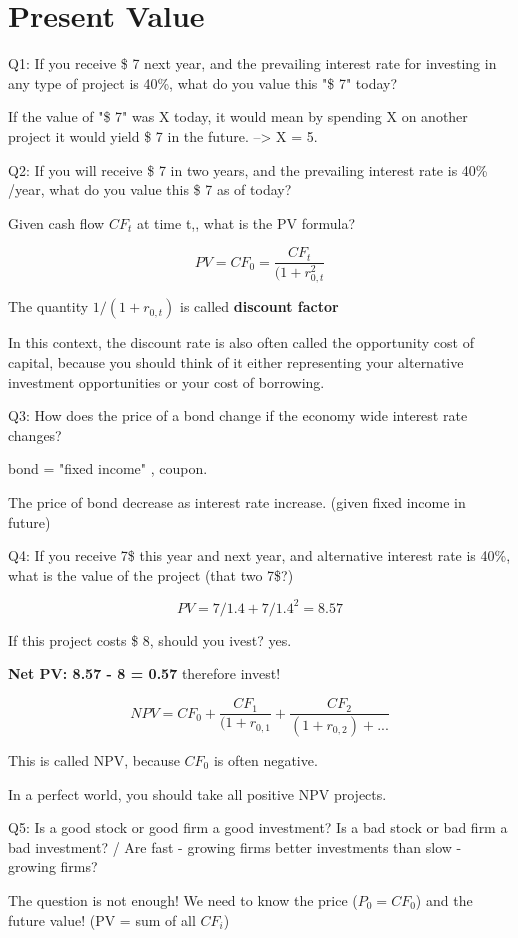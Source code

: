 \section{Present Value}

Q1: If you receive \$ 7 next year, and the prevailing interest rate for investing in any type of project is 40\%, what do you value this "\$ 7" today?

If the value of "\$ 7" was X today, it would mean by spending X on another project it would yield \$ 7 in the future. --> X = 5.

Q2: If you will receive \$ 7 in two years, and the prevailing  interest rate is 40\% /year, what do you value this \$ 7 as of today?

Given cash flow $CF_t$ at time t,, what is the PV formula?

\[
PV = CF_0 = \frac{CF_t}{(1 + r_{0,t}^2}
\]

The quantity $1/(1 + r_{0,t})$ is called \textbf{discount factor}

In this context, the discount rate is also often called the opportunity cost of capital, because you should think of it either representing your alternative investment opportunities or your cost of borrowing.

Q3: How does the price of a bond change if the economy wide interest rate changes?

bond = "fixed income" , coupon.

The price of bond decrease as interest rate increase. (given fixed income in future)

Q4: If you receive 7\$ this year and next year, and alternative interest rate is 40\%, what is the value of the project (that two 7\$?)

\[PV = 7/1.4 + 7/1.4^2 = 8.57\]

If this project costs \$ 8, should you ivest? yes.

\textbf{Net PV: 8.57 - 8 = 0.57} therefore invest!

\[
NPV = CF_0 + \frac{CF_1}{(1 + r_{0,1}} + \frac{CF_2}{(1 + r_{0,2}) + ...} 
\]

This is called NPV, because $CF_0$ is often negative.

In a perfect world, you should take all positive NPV projects.

Q5: Is a good stock or good firm a good investment? Is a bad stock or bad firm a bad investment? / Are fast - growing firms better investments than slow - growing firms?

The question is not enough! We need to know the price ($P_0 = CF_0$) and the future value! (PV = sum of all $CF_i$)


